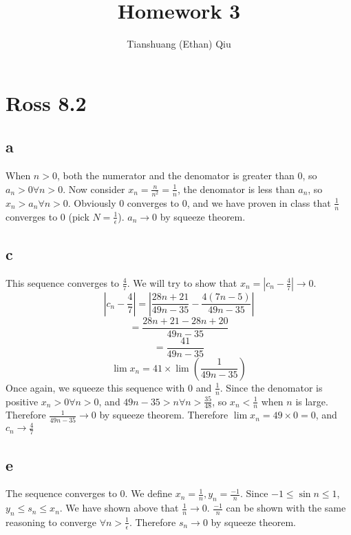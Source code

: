 \documentclass[12pt]{article}
\author{Tianshuang (Ethan) Qiu}
\begin{document}
\title{Homework 3}
\maketitle
\newpage

\section{Ross 8.2}

\subsection{a}
When $n>0$, both the numerator and the denomator is greater than 0, so $a_n > 0 \forall n>0$. Now consider $x_n = \frac{n}{n^2} = \frac{1}{n}$, the denomator is less than $a_n$, so $x_n > a_n \forall n>0$.
\newline
Obviously 0 converges to 0, and we have proven in class that $\frac{1}{n}$ converges to 0 (pick $N = \frac{1}{\epsilon}$). $a_n \to 0$ by squeeze theorem.


\subsection{c}
This sequence converges to $\frac{4}{7}$. We will try to show that $x_n = |c_n-\frac{4}{7}| \to 0$.
\newline
$$|c_n-\frac{4}{7}| = |\frac{28n+21}{49n-35} - \frac{4(7n-5)}{49n-35}|$$
$$= \frac{28n+21-28n+20}{49n-35}$$
$$= \frac{41}{49n-35}$$
$$\lim x_n = 41 \times \lim (\frac{1}{49n-35})$$
Once again, we squeeze this sequence with 0 and $\frac{1}{n}$. Since the denomator is positive $x_n > 0 \forall n>0$, and $49n-35 > n \forall n>\frac{35}{48}$, so $x_n < \frac{1}{n}$ when $n$ is large. Therefore $\frac{1}{49n-35} \to 0$ by squeeze theorem.
\newline
Therefore $\lim x_n = 49 \times 0 = 0$, and $c_n \to \frac{4}{7}$


\subsection{e}
The sequence converges to 0. We define $x_n = \frac{1}{n}, y_n = \frac{-1}{n}$. Since $-1 \leq \sin n \leq 1$, $y_n \leq s_n \leq x_n$.
\newline
We have shown above that $\frac{1}{n} \to 0$. $\frac{-1}{n}$ can be shown with the same reasoning to converge $\forall n>\frac{1}{\epsilon}$. Therefore $s_n \to 0$ by squeeze theorem.
\newpage
\end{document}
